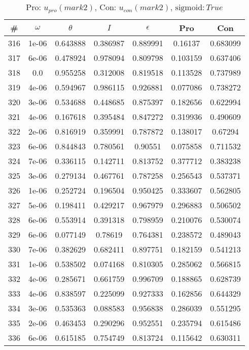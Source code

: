 \newpage
\begin{table}
\caption{Pro: $u_{pro} (mark 2)$, Con: $u_{con} (mark 2)$, $\mathrm{sigmoid}: True$}
\begin{tabular*}{\linewidth}{c|c|c|c|c|c|c}
\# & $\omega$ & $\theta$ & $I$ & $\epsilon$ & Pro & Con \\
\hline
316 & 1e-06 & 0.643888 & 0.386987 & 0.889991 & 0.16137 & 0.683099\\
317 & 6e-06 & 0.478924 & 0.978094 & 0.809798 & 0.103159 & 0.637406\\
318 & 0.0 & 0.955258 & 0.312008 & 0.819518 & 0.113528 & 0.737989\\
319 & 4e-06 & 0.594967 & 0.986115 & 0.926881 & 0.077086 & 0.738272\\
320 & 3e-06 & 0.534688 & 0.448685 & 0.875397 & 0.182656 & 0.622994\\
321 & 4e-06 & 0.167618 & 0.395484 & 0.847272 & 0.319936 & 0.490609\\
322 & 2e-06 & 0.816919 & 0.359991 & 0.787872 & 0.138017 & 0.67294\\
323 & 6e-06 & 0.844843 & 0.780561 & 0.90551 & 0.075858 & 0.711532\\
324 & 7e-06 & 0.336115 & 0.142711 & 0.813752 & 0.377712 & 0.383238\\
325 & 3e-06 & 0.279134 & 0.467761 & 0.787258 & 0.256543 & 0.537371\\
326 & 1e-06 & 0.252724 & 0.196504 & 0.950425 & 0.333607 & 0.562805\\
327 & 5e-06 & 0.198411 & 0.429217 & 0.967979 & 0.296883 & 0.506502\\
328 & 6e-06 & 0.553914 & 0.391318 & 0.798959 & 0.210076 & 0.530074\\
329 & 6e-06 & 0.077149 & 0.78619 & 0.764381 & 0.238572 & 0.489043\\
330 & 7e-06 & 0.382629 & 0.682411 & 0.897751 & 0.182159 & 0.541213\\
331 & 1e-06 & 0.538502 & 0.074168 & 0.810305 & 0.285062 & 0.566815\\
332 & 4e-06 & 0.285671 & 0.661759 & 0.996709 & 0.188865 & 0.628739\\
333 & 4e-06 & 0.838597 & 0.225099 & 0.927333 & 0.162856 & 0.644329\\
334 & 3e-06 & 0.535363 & 0.088583 & 0.956838 & 0.286039 & 0.551295\\
335 & 2e-06 & 0.463453 & 0.290296 & 0.952551 & 0.235794 & 0.615486\\
336 & 6e-06 & 0.615185 & 0.754749 & 0.813724 & 0.115642 & 0.630311\\

\end{tabular*}
\end{table}
